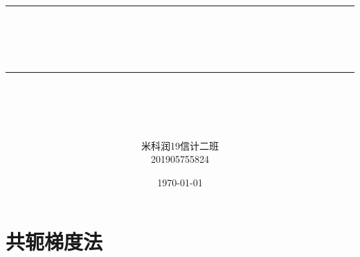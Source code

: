 \documentclass[12pt]{article} %
\newcommand{\horrule}[1]{\rule[0.5ex]{\linewidth}{#1}} 	%
\begin{document}
	\title{
		\horrule{0.5pt}\\
		\horrule{1.8pt}\\[20pt]
	}
	\author{米科润\quad 19信计二班\\201905755824}
	\date{\today} %
	
	\begin{titlepage}
		\maketitle
		\vspace{30pt}
		\thispagestyle{empty}
	\end{titlepage}
	
	\tableofcontents
	\thispagestyle{empty}
	
	\newpage
	\setcounter{page}{1}
	
	\section{共轭梯度法}
\end{document}
